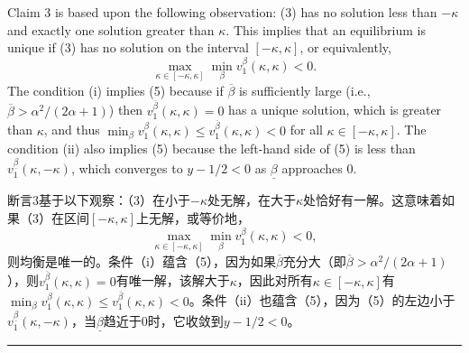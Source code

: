 \documentclass[12pt,a4paper]{article}
\newenvironment{original}
  {\par\medskip\noindent\color{black}\ignorespaces}
  {\par\medskip}
\newenvironment{translation}
  {\par\noindent\color{darkblue}\ignorespaces}
  {\par\medskip\noindent\hrule\par\medskip}
\theoremstyle{definition}
\theoremstyle{remark}
\begin{document}
\begin{original}
Claim 3 is based upon the following observation: (3) has no solution less than $-\kappa$ and exactly one solution greater than $\kappa$. This implies that an equilibrium is unique if (3) has no solution on the interval $[-\kappa, \kappa]$, or equivalently,
\[
\max_{\kappa \in [-\kappa, \kappa]} \min_{\beta} v_1^\beta(\kappa, \kappa) < 0.
\tag{5}
\]
The condition (i) implies (5) because if $\overline{\beta}$ is sufficiently large (i.e., $\overline{\beta} > \alpha^2/(2\alpha+1)$) then $v_1^{\overline{\beta}}(\kappa, \kappa) = 0$ has a unique solution, which is greater than $\kappa$, and thus $\min_{\beta} v_1^\beta(\kappa, \kappa) \le v_1^{\overline{\beta}}(\kappa, \kappa) < 0$ for all $\kappa \in [-\kappa, \kappa]$. The condition (ii) also implies (5) because the left-hand side of (5) is less than $v_1^{\underline{\beta}}(\kappa, -\kappa)$, which converges to $y - 1/2 < 0$ as $\underline{\beta}$ approaches 0.
\end{original}
\begin{translation}
断言3基于以下观察：（3）在小于$-\kappa$处无解，在大于$\kappa$处恰好有一解。这意味着如果（3）在区间$[-\kappa, \kappa]$上无解，或等价地，
\[
\max_{\kappa \in [-\kappa, \kappa]} \min_{\beta} v_1^\beta(\kappa, \kappa) < 0,
\tag{5}
\]
则均衡是唯一的。条件（i）蕴含（5），因为如果$\overline{\beta}$充分大（即$\overline{\beta} > \alpha^2/(2\alpha+1)$），则$v_1^{\overline{\beta}}(\kappa, \kappa) = 0$有唯一解，该解大于$\kappa$，因此对所有$\kappa \in [-\kappa, \kappa]$有$\min_{\beta} v_1^\beta(\kappa, \kappa) \le v_1^{\overline{\beta}}(\kappa, \kappa) < 0$。条件（ii）也蕴含（5），因为（5）的左边小于$v_1^{\underline{\beta}}(\kappa, -\kappa)$，当$\underline{\beta}$趋近于0时，它收敛到$y - 1/2 < 0$。
\end{translation}
\end{document}
